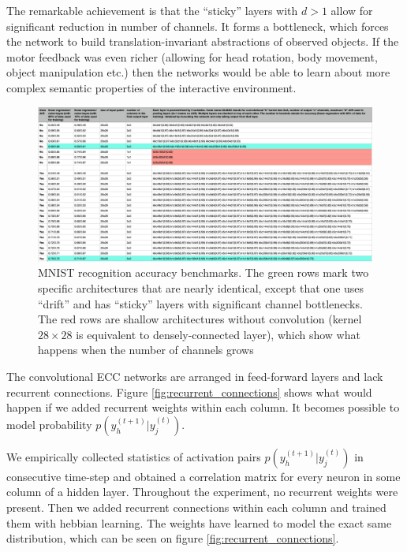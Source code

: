 \documentclass[12pt]{article}
\begin{document}
The remarkable achievement is that the ``sticky'' layers with $d>1$ allow for significant reduction in number of channels. It forms a bottleneck, which forces the network to build translation-invariant abstractions of observed objects. If the motor feedback was even richer (allowing for head rotation, body movement, object manipulation etc.) then the networks would be able to learn about more complex semantic properties of the interactive environment.

\begin{figure}[!htbp]
	\centering
	\includegraphics[width=13.8cm]{benchmarks}
	\caption{MNIST recognition accuracy benchmarks. The green rows mark two specific architectures that are nearly identical, except that one uses ``drift'' and has ``sticky'' layers with significant channel bottlenecks.  The red rows are shallow architectures without convolution (kernel $28\times28$ is equivalent to densely-connected layer), which show what happens when the number of channels grows}
	\label{fig:benchmarks}
\end{figure} 

The convolutional ECC networks are arranged in feed-forward layers and lack recurrent connections. Figure \ref{fig:recurrent_connections} shows what would happen if we added recurrent weights within each column. It becomes possible to model probability $p(y_h^{(t+1)}|y_j^{(t)})$. 

We empirically collected statistics of activation pairs $p(y_h^{(t+1)}|y_j^{(t)})$ in consecutive time-step and obtained a correlation matrix for every neuron in some column of a hidden layer. Throughout the experiment, no recurrent weights were present. Then we added recurrent connections within each column and trained them with hebbian learning. The weights have learned to model the exact same distribution, which can be seen on figure \ref{fig:recurrent_connections}.
\end{document}
